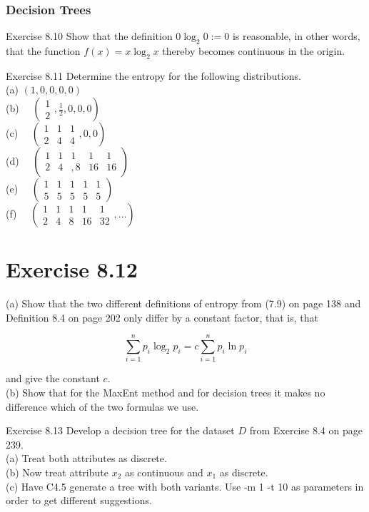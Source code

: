 \documentclass[10pt]{book}
\begin{document}
\subsubsection*{Decision Trees}
Exercise 8.10 Show that the definition $0 \log _{2} 0:=0$ is reasonable, in other words, that the function $f(x)=x \log _{2} x$ thereby becomes continuous in the origin.

Exercise 8.11 Determine the entropy for the following distributions.\\
(a) $(1,0,0,0,0)$\\
(b) $\quad\left(\begin{array}{l}1 \\ 2\end{array}, \frac{1}{2}, 0,0,0\right)$\\
(c) $\quad\left(\begin{array}{ccc}1 & 1 & 1 \\ 2 & 4 & 4\end{array}, 0,0\right)$\\
(d) $\quad\left(\begin{array}{ccccc}1 & 1 & 1 & 1 & 1 \\ 2 & 4 & , 8 & 16 & 16\end{array}\right)$\\
(e) $\quad\left(\begin{array}{ccccc}1 & 1 & 1 & 1 & 1 \\ 5 & 5 & 5 & 5 & 5\end{array}\right)$\\
(f) $\quad\left(\begin{array}{ccccc}1 & 1 & 1 & 1 & 1 \\ 2 & 4 & 8 & 16 & 32\end{array}, \ldots\right)$

\section*{Exercise 8.12}
(a) Show that the two different definitions of entropy from (7.9) on page 138 and Definition 8.4 on page 202 only differ by a constant factor, that is, that

$$
\sum_{i=1}^{n} p_{i} \log _{2} p_{i}=c \sum_{i=1}^{n} p_{i} \ln p_{i}
$$

and give the constant $c$.\\
(b) Show that for the MaxEnt method and for decision trees it makes no difference which of the two formulas we use.


Exercise 8.13 Develop a decision tree for the dataset $D$ from Exercise 8.4 on page 239.\\
(a) Treat both attributes as discrete.\\
(b) Now treat attribute $x_{2}$ as continuous and $x_{1}$ as discrete.\\
(c) Have C4.5 generate a tree with both variants. Use -m 1 -t 10 as parameters in order to get different suggestions.
\end{document}
